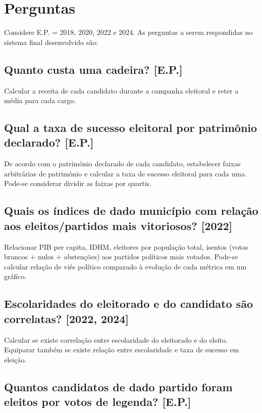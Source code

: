\chapter{Perguntas}\label{cap:proposta}

Considere E.P. = {2018, 2020, 2022 e 2024}.
As perguntas a serem respondidas no sistema final desenvolvido são:


\section{Quanto custa uma cadeira? [E.P.]}

Calcular a receita de cada candidato durante a campanha eleitoral e reter a média para cada cargo.


\section{Qual a taxa de sucesso eleitoral por patrimônio declarado? [E.P.]}

De acordo com o patrimônio declarado de cada candidato, estabelecer faixas arbitrárias de patrimônio e calcular a taxa de sucesso
 eleitoral para cada uma. Pode-se considerar dividir as faixas por quartis.

 \section{Quais os índices de dado município com relação aos eleitos/partidos mais vitoriosos? [2022]}

 Relacionar PIB per capita, IDHM, eleitores por população total, isentos (votos brancos + nulos + abstenções)
 aos partidos políticos mais votados. Pode-se calcular relação de viés político comparado à evolução de cada métrica em
 um gráfico.

 \section{Escolaridades do eleitorado e do candidato são correlatas? [2022, 2024]}

Calcular se existe correlação entre escolaridade do eleitorado e do eleito. Equiparar também
se existe relação entre escolaridade e taxa de sucesso em eleição.

\section{Quantos candidatos de dado partido foram eleitos por votos de legenda? [E.P.]}

